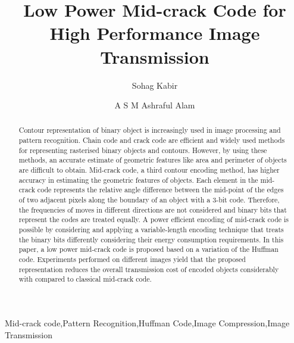 \documentclass[preprint]{elsarticle} %
\begin{document}
\begin{frontmatter}

\title{Low Power Mid-crack Code for High Performance Image Transmission}

\author[uk]{Sohag Kabir}

\author[nz]{A S M Ashraful Alam}


\address[uk]{Department of Computer Science, University of Hull, UK}
\address[nz]{Department of Computer Science, University of Otago, New Zealand}



\begin{abstract}
Contour representation of binary object is increasingly used in image processing and pattern recognition. Chain code and crack code are efficient and widely used methods for representing rasterised binary objects and contours. However, by using these methods, an accurate estimate of geometric features like area and perimeter of objects are difficult to obtain. Mid-crack code, a third contour encoding method, has higher accuracy in estimating the geometric features of objects. Each element in the
mid-crack code represents the relative angle difference between the mid-point of the edges of two adjacent pixels along the boundary of an object with a 3-bit code. Therefore, the frequencies of moves in different directions are not considered and binary bits that represent the codes are treated equally. A power efficient encoding of mid-crack code is possible by considering and applying a variable-length encoding technique that treats the binary bits differently considering their energy consumption requirements. In this paper, a low power mid-crack code is proposed based on a variation of the Huffman code. Experiments performed on different images yield that the proposed representation reduces the overall transmission cost of encoded objects considerably with compared to classical
mid-crack code.
\end{abstract}

\begin{keyword}
Mid-crack code\sep Pattern Recognition\sep  Huffman Code\sep Image Compression\sep Image Transmission
\end{keyword}

\end{frontmatter}
\end{document}
